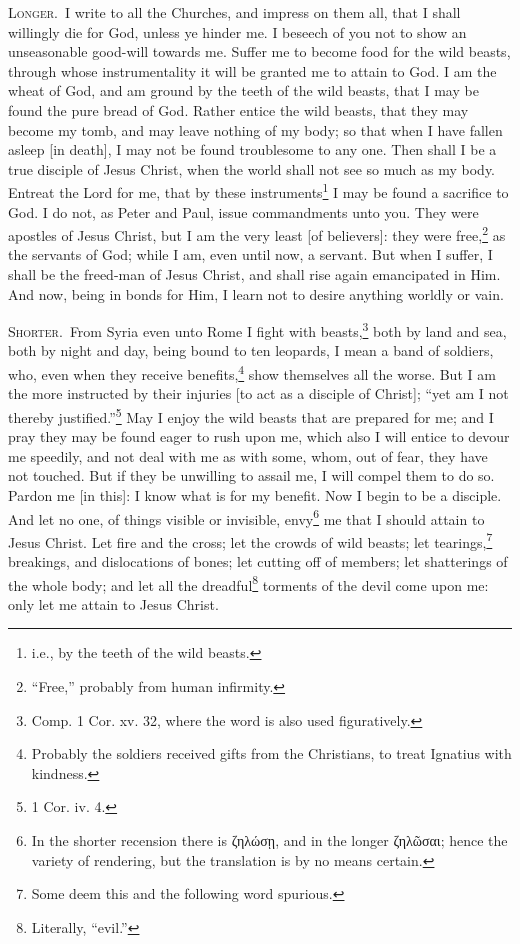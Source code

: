 \textsc{Longer.}~I write to all the Churches, and impress on them all, that I shall willingly die for God, unless ye hinder me. I beseech of you not to show an unseasonable good-will towards me. Suffer me to become food for the wild beasts, through whose instrumentality it will be granted me to attain to God. I am the wheat of God, and am ground by the teeth of the wild beasts, that I may be found the pure bread of God. Rather entice the wild beasts, that they may become my tomb, and may leave nothing of my body; so that when I have fallen asleep [in death], I may not be found troublesome to any one. Then shall I be a true disciple of Jesus Christ, when the world shall not see so much as my body. Entreat the Lord for me, that by these instruments\footnote{i.e., by the teeth of the wild beasts.} I may be found a sacrifice to God. I do not, as Peter and Paul, issue commandments unto you. They were apostles of Jesus Christ, but I am the very least [of believers]: they were free,\footnote{“Free,” probably from human infirmity.} as the servants of God; while I am, even until now, a servant. But when I suffer, I shall be the freed-man of Jesus Christ, and shall rise again emancipated in Him. And now, being in bonds for Him, I learn not to desire anything worldly or vain.


\textsc{Shorter.}~From Syria even unto Rome I fight with beasts,\footnote{Comp. 1 Cor. xv. 32, where the word is also used figuratively.} both by land and sea, both by night and day, being bound to ten leopards, I mean a band of soldiers, who, even when they receive benefits,\footnote{Probably the soldiers received gifts from the Christians, to treat Ignatius with kindness.} show themselves all the worse. But I am the more instructed by their injuries [to act as a disciple of Christ]; “yet am I not thereby justified.”\footnote{1 Cor. iv. 4.} May I enjoy the wild beasts that are prepared for me; and I pray they may be found eager to rush upon me, which also I will entice to devour me speedily, and not deal with me as with some, whom, out of fear, they have not touched. But if they be unwilling to assail me, I will compel them to do so. Pardon me  [in this]: I know what is for my benefit. Now I begin to be a disciple. And let no one, of things visible or invisible, envy\footnote{In the shorter recension there is \textgreek{ζηλώσῃ}, and in the longer \textgreek{ζηλῶσαι}; hence the variety of rendering, but the translation is by no means certain.} me that I should attain to Jesus Christ. Let fire and the cross; let the crowds of wild beasts; let tearings,\footnote{Some deem this and the following word spurious.} breakings, and dislocations of bones; let cutting off of members; let shatterings of the whole body; and let all the dreadful\footnote{Literally, “evil.”} torments of the devil come upon me: only let me attain to Jesus Christ.


